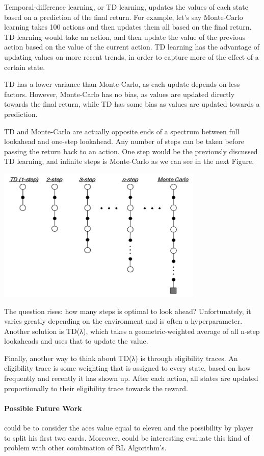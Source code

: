 \documentclass[11pt]{article}
\theoremstyle{plain}
\theoremstyle{definition}
\begin{document}
Temporal-difference learning, or TD learning, updates the values of each state based on a prediction of the final return. For example, let's say Monte-Carlo learning takes 100 actions and then updates them all based on the final return. TD learning would take an action, and then update the value of the previous action based on the value of the current action. TD learning has the advantage of updating values on more recent trends, in order to capture more of the effect of a certain state.

TD has a lower variance than Monte-Carlo, as each update depends on less factors. However, Monte-Carlo has no bias, as values are updated directly towards the final return, while TD has some bias as values are updated towards a prediction.

TD and Monte-Carlo are actually opposite ends of a spectrum between full lookahead and one-step lookahead. Any number of steps can be taken before passing the return back to an action. One step would be the previously discussed TD learning, and infinite steps is Monte-Carlo as we can see in the next Figure.

\begin{center}
\includegraphics[scale=0.7]{20}
\end{center}

The question rises: how many steps is optimal to look ahead? Unfortunately, it varies greatly depending on the environment and is often a hyperparameter. Another solution is TD(λ), which takes a geometric-weighted average of all n-step lookaheads and uses that to update the value.

Finally, another way to think about TD(λ) is through eligibility traces. An eligibility trace is some weighting that is assigned to every state, based on how frequently and recently it has shown up. After each action, all states are updated proportionally to their eligibility trace towards the reward.

\paragraph{Possible Future Work} could be to consider the aces value equal to eleven and the possibility by player to split his first two cards.
Moreover, could be interesting evaluate this kind of problem with other combination of RL Algorithm's.
\end{document}
